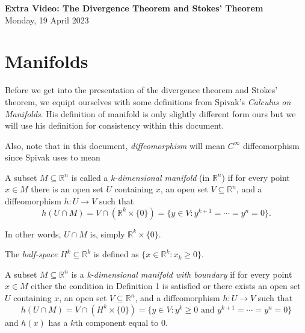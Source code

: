 \documentclass[11pt]{article}
\theoremstyle{definition}
\newcommand{\R}{\mathbb{R}}                      %
\begin{document}
\thispagestyle{empty}

\begin{center}
{\LARGE \bf Extra Video: The Divergence Theorem and Stokes' Theorem}\\
{\large Monday, 19 April 2023}\\
\end{center}
\section{Manifolds}
Before we get into the presentation of the divergence theorem and Stokes' theorem, we equipt ourselves with some definitions from Spivak's \textit{Calculus on Manifolds}. His definition of manifold is only slightly different form ours but we will use his definition for consistency within this document. 

Also, note that in this document, \textit{diffeomorphism} will mean $C^\infty$ diffeomorphism since Spivak uses  to mean   
\begin{mdframed}[backgroundcolor = blue!10]
\vspace{+0.1cm}
 A subset $M\subseteq \R^n$ is called a \textit{k-dimensional manifold} (in $\R^n$) if for every point $x\in M$ there is an open set $U$ containing $x$, an open set $V\subseteq \R^n$, and a diffeomorphism $h:U\to V$ such that
$$
h(U\cap M) = V\cap (\R^k \times \{0\})=\{y\in V: y^{k+1}=\cdots = y^n = 0\}.
$$
\end{mdframed}
In other words, $U\cap M$ is,  simply $\R^k\times \{0\}$.

\begin{mdframed}[backgroundcolor = blue!10]
\vspace{+0.1cm}
 The \textit{half-space} $H^k\subseteq \R^k$ is defined as $\{x\in \R^k : x_k\geq 0\}$. 

 A subset $M\subseteq \R^n$ is a \textit{k-dimensional manifold with boundary} if for every point $x\in M$ either the condition in Definition 1 is satisfied or there exists an open set $U$ containing $x$, an open set $V\subseteq \R^n$, and a diffeomorphism $h:U\to V$ such that
$$
h(U\cap M) = V\cap (H^k\times \{0\}) = \{y\in V: y^k\geq 0\mbox{ and }y^{k+1}=\cdots=y^n=0\}
$$
and $h(x)$ has a $k$th component equal to 0.
\end{mdframed}
\end{document}

